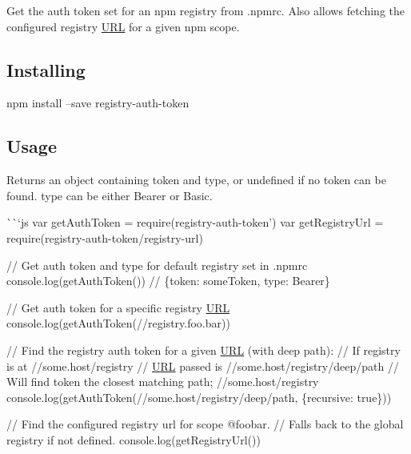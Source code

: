 \href{http://browsenpm.org/package/registry-auth-token}{\tt }\href{https://travis-ci.org/rexxars/registry-auth-token}{\tt }

Get the auth token set for an npm registry from {\ttfamily .npmrc}. Also allows fetching the configured registry \mbox{\hyperlink{namespace_u_r_l}{U\+RL}} for a given npm scope.

\subsection*{Installing}


\begin{DoxyCode}
npm install --save registry-auth-token
\end{DoxyCode}


\subsection*{Usage}

Returns an object containing {\ttfamily token} and {\ttfamily type}, or {\ttfamily undefined} if no token can be found. {\ttfamily type} can be either {\ttfamily Bearer} or {\ttfamily Basic}.

\`{}\`{}`js var get\+Auth\+Token = require(\textquotesingle{}registry-\/auth-\/token') var get\+Registry\+Url = require(\textquotesingle{}registry-\/auth-\/token/registry-\/url\textquotesingle{})

// Get auth token and type for default {\ttfamily registry} set in {\ttfamily .npmrc} console.\+log(get\+Auth\+Token()) // \{token\+: \textquotesingle{}some\+Token\textquotesingle{}, type\+: \textquotesingle{}Bearer\textquotesingle{}\}

// Get auth token for a specific registry \mbox{\hyperlink{namespace_u_r_l}{U\+RL}} console.\+log(get\+Auth\+Token(\textquotesingle{}//registry.foo.\+bar\textquotesingle{}))

// Find the registry auth token for a given \mbox{\hyperlink{namespace_u_r_l}{U\+RL}} (with deep path)\+: // If registry is at {\ttfamily //some.host/registry} // \mbox{\hyperlink{namespace_u_r_l}{U\+RL}} passed is {\ttfamily //some.host/registry/deep/path} // Will find token the closest matching path; {\ttfamily //some.host/registry} console.\+log(get\+Auth\+Token(\textquotesingle{}//some.host/registry/deep/path\textquotesingle{}, \{recursive\+: true\}))

// Find the configured registry url for scope {\ttfamily @foobar}. // Falls back to the global registry if not defined. console.\+log(get\+Registry\+Url(\textquotesingle{}\textquotesingle{}))

